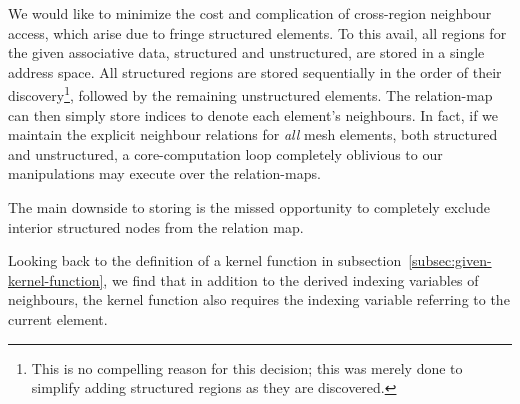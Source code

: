 We would like to minimize the cost and complication of cross-region neighbour access, which arise due to fringe structured elements. To this avail, all regions for the given associative data, structured and unstructured, are stored in a single address space. All structured regions are stored sequentially in the order of their discovery\footnote{This is no compelling reason for this decision; this was merely done to simplify adding structured regions as they are discovered.}, followed by the remaining unstructured elements.
The relation-map can then simply store indices to denote each element's neighbours. In fact, if we maintain the explicit neighbour relations for \emph{all} mesh elements, both structured and unstructured, a core-computation loop completely oblivious to our manipulations may execute over the relation-maps.

The main downside to storing is the missed opportunity to completely exclude interior structured nodes from the relation map.



Looking back to the definition of a kernel function in subsection~\ref{subsec:given-kernel-function}, we find that in addition to the derived indexing variables of neighbours, the kernel function also requires the indexing variable referring to the current element.
